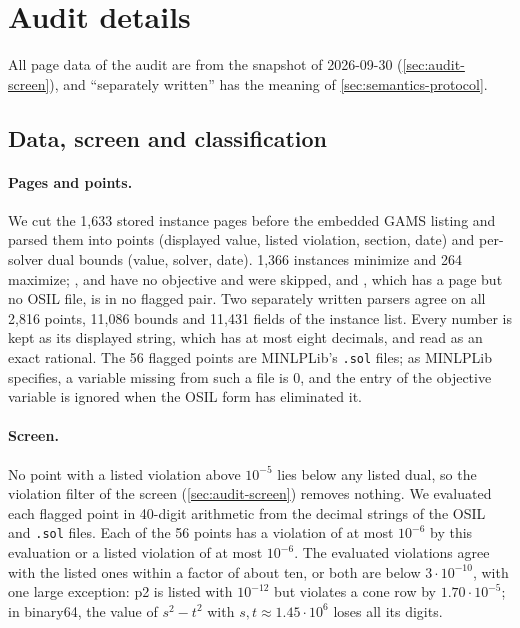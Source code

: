 \section{Audit details}\label{app:audit}

All page data of the audit are from the snapshot of 2026-09-30 (\cref{sec:audit-screen}), and ``separately written'' has the meaning of \cref{sec:semantics-protocol}.

\subsection{Data, screen and classification}\label{app:audit-screen}

\paragraph{Pages and points.}
We cut the 1,633 stored instance pages before the embedded GAMS listing and parsed them into points (displayed value, listed violation, section, date) and per-solver dual bounds (value, solver, date).
1,366 instances minimize and 264 maximize; ,  and  have no objective and were skipped, and , which has a page but no OSIL file, is in no flagged pair.
Two separately written parsers agree on all 2,816 points, 11,086 bounds and 11,431 fields of the instance list.
Every number is kept as its displayed string, which has at most eight decimals, and read as an exact rational.
The 56 flagged points are MINLPLib's \texttt{.sol} files; as MINLPLib specifies, a variable missing from such a file is 0, and the entry of the objective variable is ignored when the OSIL form has eliminated it.

\paragraph{Screen.}
No point with a listed violation above $10^{-5}$ lies below any listed dual, so the violation filter of the screen (\cref{sec:audit-screen}) removes nothing.
We evaluated each flagged point in 40-digit arithmetic from the decimal strings of the OSIL and \texttt{.sol} files.
Each of the 56 points has a violation of at most $10^{-6}$ by this evaluation or a listed violation of at most $10^{-6}$.
The evaluated violations agree with the listed ones within a factor of about ten, or both are below $3\cdot10^{-10}$, with one large exception:  p2 is listed with $10^{-12}$ but violates a cone row by $1.70\cdot10^{-5}$; in binary64, the value of $s^2-t^2$ with $s,t\approx1.45\cdot10^{6}$ loses all its digits.
